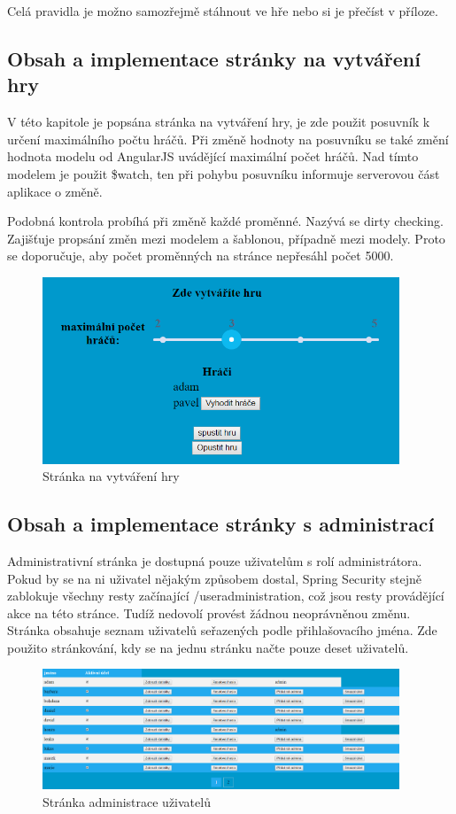 \documentclass[czech,master,public,dept460,male,cpdeclaration,twoside]{diploma}
\begin{document}
Celá pravidla je možno samozřejmě stáhnout ve hře nebo si je přečíst v příloze.

\subsection{Obsah a implementace stránky na vytváření hry}
V této kapitole je popsána stránka na vytváření hry, je zde použit posuvník k určení maximálního počtu hráčů. Při změně hodnoty na posuvníku se také změní hodnota modelu od AngularJS uvádějící maximální počet hráčů. Nad tímto modelem je použit \$watch, ten při pohybu posuvníku informuje serverovou část aplikace o změně.

Podobná kontrola probíhá při změně každé proměnné. Nazývá se dirty checking. Zajišťuje propsání změn mezi modelem a šablonou, případně mezi modely. Proto se doporučuje, aby počet proměnných na stránce nepřesáhl počet 5000.

\begin{figure}[H]
\centering\includegraphics[width=0.95\textwidth]{Figures/gamecreationpage.png}\caption{Stránka na vytváření hry}
\end{figure}

\subsection{Obsah a implementace stránky s administrací}
Administrativní stránka je dostupná pouze uživatelům s rolí administrátora. Pokud by se na ni uživatel nějakým způsobem dostal, Spring Security stejně zablokuje všechny resty začínající /useradministration, což jsou resty provádějící akce na této stránce. Tudíž nedovolí provést žádnou neoprávněnou změnu. Stránka obsahuje seznam uživatelů seřazených podle přihlašovacího jména. Zde použito stránkování, kdy se na jednu stránku načte pouze deset uživatelů.

\begin{figure}[H]
\centering\includegraphics[width=0.95\textwidth]{Figures/administrationpage.png}\caption{Stránka administrace uživatelů}
\end{figure}
\end{document}
